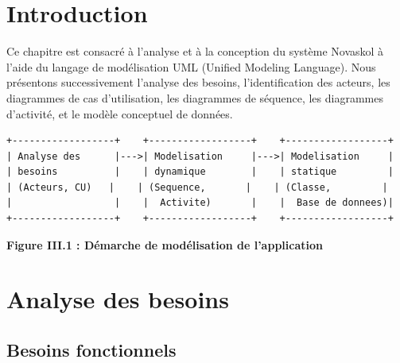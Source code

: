 \documentclass[12pt,a4paper,twoside]{report}
\begin{document}
\section{Introduction}

Ce chapitre est consacré à l'analyse et à la conception du système Novaskol à l'aide du langage de modélisation UML (Unified Modeling Language). Nous présentons successivement l'analyse des besoins, l'identification des acteurs, les diagrammes de cas d'utilisation, les diagrammes de séquence, les diagrammes d'activité, et le modèle conceptuel de données.

\begin{verbatim}
+------------------+    +------------------+    +------------------+
| Analyse des      |--->| Modelisation     |--->| Modelisation     |
| besoins          |    | dynamique        |    | statique         |
| (Acteurs, CU)   |    | (Sequence,       |    | (Classe,         |
|                  |    |  Activite)       |    |  Base de donnees)|
+------------------+    +------------------+    +------------------+
\end{verbatim}

\begin{center}
\textbf{Figure III.1 : Démarche de modélisation de l'application}
\end{center}

\section{Analyse des besoins}

\subsection{Besoins fonctionnels}
\end{document}
